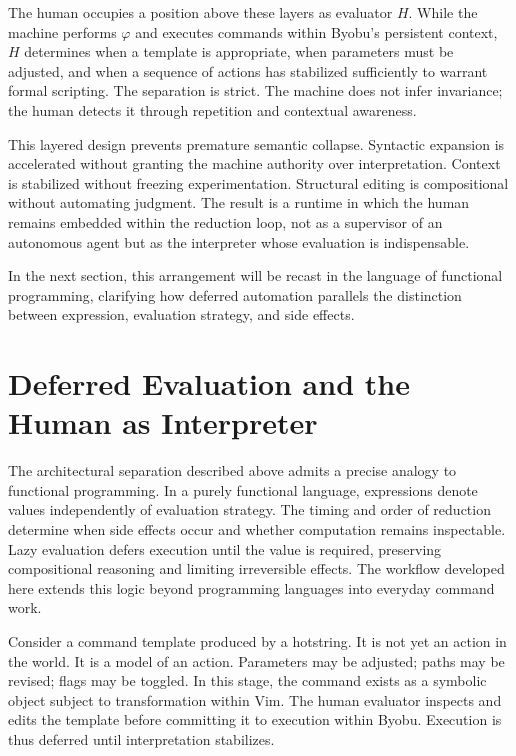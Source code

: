\documentclass[11pt]{article}
\begin{document}
The human occupies a position above these layers as evaluator \(H\). While the machine performs \(\varphi\) and executes commands within Byobu’s persistent context, \(H\) determines when a template is appropriate, when parameters must be adjusted, and when a sequence of actions has stabilized sufficiently to warrant formal scripting. The separation is strict. The machine does not infer invariance; the human detects it through repetition and contextual awareness.

This layered design prevents premature semantic collapse. Syntactic expansion is accelerated without granting the machine authority over interpretation. Context is stabilized without freezing experimentation. Structural editing is compositional without automating judgment. The result is a runtime in which the human remains embedded within the reduction loop, not as a supervisor of an autonomous agent but as the interpreter whose evaluation is indispensable.

In the next section, this arrangement will be recast in the language of functional programming, clarifying how deferred automation parallels the distinction between expression, evaluation strategy, and side effects.

\section{Deferred Evaluation and the Human as Interpreter}

The architectural separation described above admits a precise analogy to functional programming. In a purely functional language, expressions denote values independently of evaluation strategy. The timing and order of reduction determine when side effects occur and whether computation remains inspectable. Lazy evaluation defers execution until the value is required, preserving compositional reasoning and limiting irreversible effects. The workflow developed here extends this logic beyond programming languages into everyday command work.

Consider a command template produced by a hotstring. It is not yet an action in the world. It is a model of an action. Parameters may be adjusted; paths may be revised; flags may be toggled. In this stage, the command exists as a symbolic object subject to transformation within Vim. The human evaluator inspects and edits the template before committing it to execution within Byobu. Execution is thus deferred until interpretation stabilizes.
\end{document}

